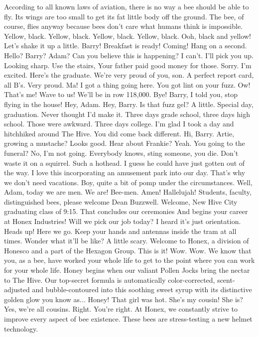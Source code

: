 \documentclass[a4paper,12pt]{article}
\begin{document}
\iffalse
According to all known laws of aviation, there is no way a bee should be able to fly.
Its wings are too small to get its fat little body off the ground.
The bee, of course, flies anyway because bees don't care what humans think is impossible.
Yellow, black. Yellow, black. Yellow, black. Yellow, black.
Ooh, black and yellow!
Let's shake it up a little.
Barry! Breakfast is ready!
Coming!
Hang on a second.
Hello?
Barry?
Adam?
Can you believe this is happening?
I can't.
I'll pick you up.
Looking sharp.
Use the stairs, Your father paid good money for those.
Sorry. I'm excited.
Here's the graduate.
We're very proud of you, son.
A perfect report card, all B's.
Very proud.
Ma! I got a thing going here.
You got lint on your fuzz.
Ow! That's me!
Wave to us! We'll be in row 118,000.
Bye!
Barry, I told you, stop flying in the house!
Hey, Adam.
Hey, Barry.
Is that fuzz gel?
A little. Special day, graduation.
Never thought I'd make it.
Three days grade school, three days high school.
Those were awkward.
Three days college. I'm glad I took a day and hitchhiked around The Hive.
You did come back different.
Hi, Barry. Artie, growing a mustache? Looks good.
Hear about Frankie?
Yeah.
You going to the funeral?
No, I'm not going.
Everybody knows, sting someone, you die.
Don't waste it on a squirrel.
Such a hothead.
I guess he could have just gotten out of the way.
I love this incorporating an amusement park into our day.
That's why we don't need vacations.
Boy, quite a bit of pomp under the circumstances.
Well, Adam, today we are men.
We are!
Bee-men.
Amen!
Hallelujah!
Students, faculty, distinguished bees,
please welcome Dean Buzzwell.
Welcome, New Hive City graduating class of 9:15.
That concludes our ceremonies And begins your career at Honex Industries!
Will we pick our job today?
I heard it's just orientation.
Heads up! Here we go.
Keep your hands and antennas inside the tram at all times.
Wonder what it'll be like?
A little scary.
Welcome to Honex, a division of Honesco and a part of the Hexagon Group.
This is it!
Wow.
Wow.
We know that you, as a bee, have worked your whole life to get to the point where you can work for your whole life.
Honey begins when our valiant Pollen Jocks bring the nectar to The Hive.
Our top-secret formula is automatically color-corrected, scent-adjusted and bubble-contoured into this soothing sweet syrup with its distinctive golden glow you know as... Honey!
That girl was hot.
She's my cousin!
She is?
Yes, we're all cousins.
Right. You're right.
At Honex, we constantly strive to improve every aspect of bee existence.
These bees are stress-testing a new helmet technology.
\end{document}
